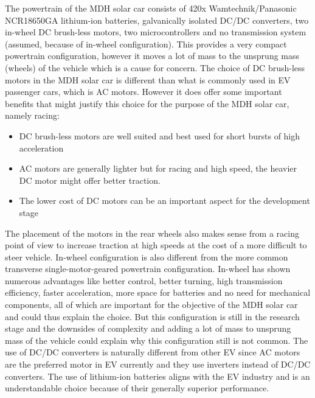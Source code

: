The powertrain of the MDH solar car consists of 420x Wamtechnik/Panasonic NCR18650GA lithium-ion batteries, galvanically isolated DC/DC converters, two in-wheel DC brush-less motors, two microcontrollers and no transmission system (assumed, because of in-wheel configuration)\:\cite{mdhsolarteamBillMaterials}\cite{panasonicLithiumIonBatteries2007}\cite{A4EnergyStorage2017}. This provides a very compact powertrain configuration, however it moves a lot of mass to the unsprung mass (wheels) of the vehicle which is a cause for concern\:\cite{othaganontMultiobjectiveOptimisationBattery2017}.
The choice of DC brush-less motors in the MDH solar car is different than what is commonly used in EV passenger cars, which is AC motors. However it does offer some important benefits that might justify this choice for the purpose of the MDH solar car, namely racing:
\begin{itemize}
	\item DC brush-less motors are well suited and best used for short bursts of high acceleration\:\cite{khajepourElectricHybridVehicles2014}
	\item AC motors are generally lighter\:\cite{carlenerikssonElektriskOchHybriddrivlina2023} but for racing and high speed, the heavier DC motor might offer better traction.
	\item The lower cost of DC motors\:\cite{carlenerikssonElektriskOchHybriddrivlina2023} can be an important aspect for the development stage
\end{itemize}
The placement of the motors in the rear wheels also makes sense from a racing point of view to increase traction at high speeds at the cost of a more difficult to steer vehicle.
In-wheel configuration is also different from the more common transverse single-motor-geared powertrain configuration\:\cite{chauEVPowertrainConfigurations2014}. In-wheel has shown numerous advantages like better control, better turning, high transmission efficiency, faster acceleration, more space for batteries and no need for mechanical components\:\cite{un-noorComprehensiveStudyKey2017}\cite{chauEVPowertrainConfigurations2014}\cite{othaganontMultiobjectiveOptimisationBattery2017}, all of which are important for the objective of the MDH solar car and could thus explain the choice. But this configuration is still in the research stage and the downsides of complexity and adding a lot of mass to unsprung mass of the vehicle could explain why this configuration still is not common\:\cite{othaganontMultiobjectiveOptimisationBattery2017}.
The use of DC/DC converters is naturally different from other EV since AC motors are the preferred motor in EV currently and they use inverters instead of DC/DC converters\:\cite{un-noorComprehensiveStudyKey2017}\cite{chauEVPowertrainConfigurations2014}.
The use of lithium-ion batteries aligns with the EV industry and is an understandable choice because of their generally superior performance\:\cite{hannanStateoftheArtEnergyManagement2018}.

